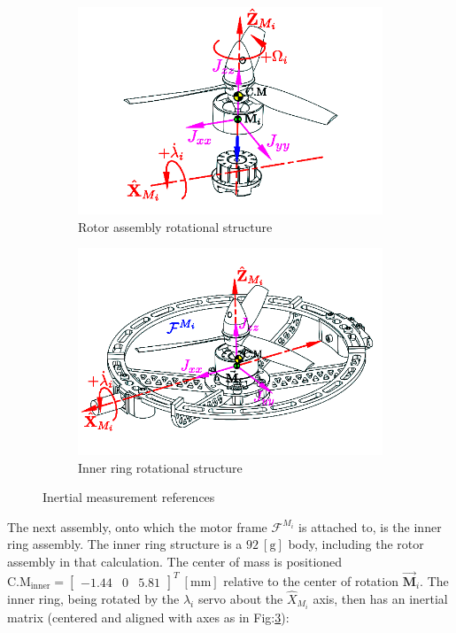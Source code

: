 \begin{figure}[htbp]
\centering
\begin{subfigure}{0.49\textwidth}
\includegraphics[width=\textwidth]{figs/inertia-prop}
\caption{Rotor assembly rotational structure}
\label{fig:inertia-prop}
\end{subfigure}
\begin{subfigure}{0.49\textwidth}
\includegraphics[width=\textwidth]{figs/inertia-inner}
\caption{Inner ring rotational structure}
\label{fig:inertia-inner}
\end{subfigure}
\caption{Inertial measurement references}
\end{figure}
\par
The next assembly, onto which the motor frame $\mathcal{F}^{M_i}$ is attached to, is the inner ring assembly. The inner ring structure is a $92~[\text{g}]$ body, including the rotor assembly in that calculation. The center of mass is positioned $\text{C.M}_{\text{inner}}=\begin{bmatrix}-1.44&0&5.81\end{bmatrix}^T~[\text{mm}]$ relative to the center of rotation $\vec{\mathbf{M}}_i$. The inner ring, being rotated by the $\lambda_i$ servo about the $\hat{X}_{M_i}$ axis, then has an inertial matrix (centered and aligned with axes as in Fig:\ref{fig:inertia-inner}):
